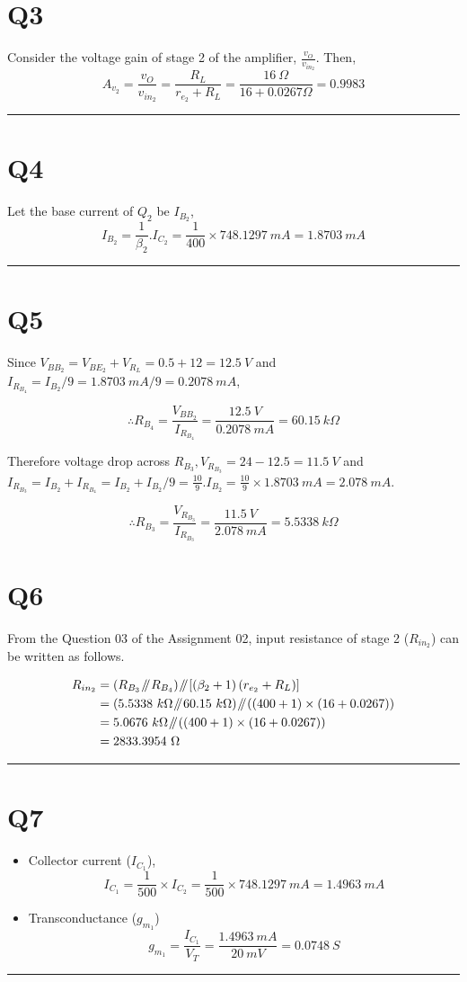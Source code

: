 \documentclass[legalpaper,11pt]{article}%
\newcommand{\parallelsum}{\mathbin{\!/\mkern-5mu/\!}}
\begin{document}
\section*{Q3}
Consider the voltage gain of stage 2 of the amplifier, $\frac{v_O}{v_{in_2}}$. Then,
\[A_{v_2} =\frac{v_O}{v_{in_2}} =\frac{R_L}{r_{e_2}+R_L} = \frac{16~\Omega}{16+ 0.0267 \Omega} = 0.9983 \]
\hrule
\section*{Q4}

Let the base current of $Q_2$ be $I_{B_2}$,
\[ I_{B_2} = \frac{1}{\beta_2}.I_{C_2}  = \frac{1}{400}\times748.1297 ~mA = 1.8703~mA\]

\hrule
\section*{Q5}

Since $V_{BB_2} = V_{BE_2} + V_{R_L} = 0.5 + 12  = 12.5 ~V $ and $I_{R_{B_4}} = I_{B_2}/9 = 1.8703~mA/9 = 0.2078 ~mA$,

\[\therefore R_{B_4} = \frac{V_{BB_2}}{I_{R_{B_4}}} = \frac{12.5~V}{ 0.2078 ~mA} = 60.15~k\Omega \]

Therefore voltage drop across $R_{B_3}, V_{R_{B_3}} = 24- 12.5 = 11.5~V$ and $I_{R_{B_3}} = I_{B_2}+I_{R_{B_4}} = I_{B_2}+I_{B_2}/9 = \frac{10}{9}.I_{B_2} = \frac{10}{9}\times1.8703~mA = 2.078~mA$.

\[\therefore R_{B_3} = \frac{V_{R_{B_3}}}{I_{R_{B_3}}} = \frac{11.5~V}{2.078~mA} =5.5338 ~k\Omega \]


\section*{Q6}
From the Question 03 of the Assignment 02, input resistance of stage 2 ($R_{in_2}$) can be written as follows.

\[
\begin{split}
	R_{in_2} &=\left( R_{B_3} \parallelsum R_{B_4}\right) \parallelsum \left[\left(\beta_2+1\right)\left(r_{e_2}+R_L\right)\right]\\
	& = \left( 5.5338 ~k\Omega \parallelsum 60.15~k\Omega  \right) \parallelsum \left( (400+1)\times(16+0.0267) \right)	\\
	& = 5.0676~k\Omega \parallelsum \left( (400+1)\times(16+0.0267) \right)	\\
	& = 2833.3954 ~\Omega
\end{split}
\]
\hrule
\section*{Q7}
\begin{itemize}
	\item Collector current ($I_{C_1}$),
	\[ I_{C_1} = \frac{1}{500}\times I_{C_2} = \frac{1}{500}\times 748.1297 ~mA = 1.4963~mA \]
	
	\item Transconductance ($g_{m_1}$)
	\[ g_{m_1} = \frac{I_{C_1}}{V_T} = \frac{1.4963 ~mA}{20~mV} = 0.0748~ S\]
\end{itemize}
\hrule
\end{document}
